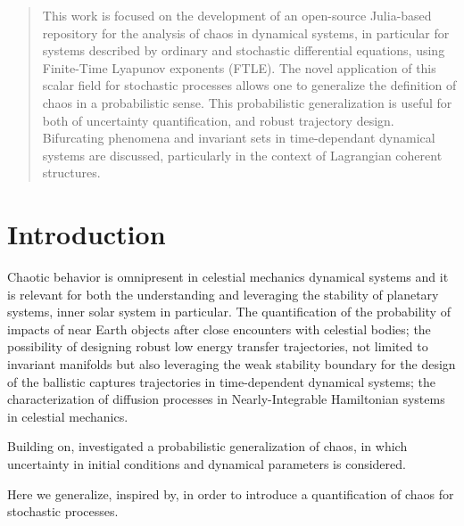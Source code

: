 \documentclass{juliacon}
\begin{document}


\maketitle

\begin{abstract}

This work is focused on the development of an open-source Julia-based repository for the analysis of chaos in dynamical systems, 
in particular for systems described by ordinary and stochastic differential equations, using Finite-Time Lyapunov exponents (FTLE).
The novel application of this scalar field for stochastic processes allows one to generalize the definition of chaos in a probabilistic sense.
This probabilistic generalization is useful for both of uncertainty quantification, and robust trajectory design.
Bifurcating phenomena and invariant sets in time-dependant dynamical systems are discussed, particularly in the context of Lagrangian coherent structures.

\end{abstract}

\section{Introduction}

Chaotic behavior is omnipresent in celestial mechanics dynamical systems and it is relevant for both the understanding and 
leveraging the stability of planetary systems, inner solar system in particular\cite{celletti}. 
The quantification of the probability of impacts of near Earth objects after close encounters with celestial bodies; 
the possibility of designing robust low energy transfer trajectories, not limited to invariant manifolds but also leveraging the 
weak stability boundary for the design of the ballistic captures trajectories in time-dependent dynamical systems; 
the characterization of diffusion processes in Nearly-Integrable Hamiltonian systems in celestial mechanics. 

Building on\cite{Szebehely82},\cite{ManziAAS2020, VasileManzi} investigated a probabilistic generalization of chaos, in which uncertainty in initial conditions and dynamical parameters is considered.

Here we generalize, inspired by\cite{Balibrea-Iniesta}, in order to introduce a quantification of chaos for stochastic processes.
\end{document}
